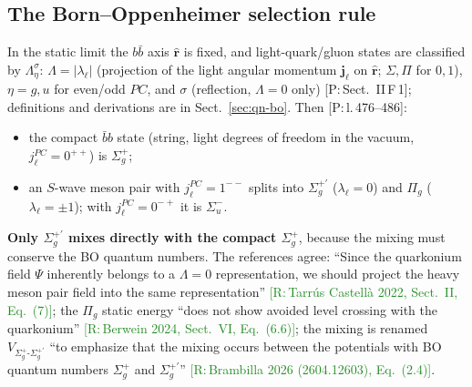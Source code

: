 \documentclass[11pt,a4paper]{article}
\newcommand{\tagP}[1]{\textcolor{blue!65!black}{\textsf{\small[P:\,#1]}}}
\newcommand{\tagR}[1]{\textcolor{ForestGreen}{\textsf{\small[R:\,#1]}}}
\begin{document}
\subsection{The Born--Oppenheimer selection rule}
\label{sec:BOrule}

In the static limit the $b\bar b$ axis $\hat{\bm r}$ is fixed, and light-quark/gluon states are classified by $\Lambda_\eta^\sigma$: $\Lambda=|\lambda_\ell|$ (projection of the light angular momentum $\bm j_\ell$ on $\hat{\bm r}$; $\Sigma,\Pi$ for $0,1$), $\eta=g,u$ for even/odd $PC$, and $\sigma$ (reflection, $\Lambda=0$ only) \tagP{Sect.~II\,F\,1}; definitions and derivations are in Sect.~\ref{sec:qn-bo}. Then \tagP{l.\,476--486}:
\begin{itemize}
\item the compact $\bar bb$ state (string, light degrees of freedom in the vacuum, $j_\ell^{PC}=0^{++}$) is $\Sigma_g^+$;
\item an $S$-wave meson pair with $j_\ell^{PC}=1^{--}$ splits into $\Sigma_g^{+\prime}$ ($\lambda_\ell=0$) and $\Pi_g$ ($\lambda_\ell=\pm1$); with $j_\ell^{PC}=0^{-+}$ it is $\Sigma_u^-$.
\end{itemize}
\textbf{Only $\Sigma_g^{+\prime}$ mixes directly with the compact $\Sigma_g^+$}, because the mixing must conserve the BO quantum numbers. The references agree: ``Since the quarkonium field $\Psi$ inherently belongs to a $\Lambda=0$ representation, we should project the heavy meson pair field into the same representation'' \tagR{Tarr\'us Castell\`a 2022, Sect.~II, Eq.~(7)}; the $\Pi_g$ static energy ``does not show avoided level crossing with the quarkonium'' \tagR{Berwein 2024, Sect.~VI, Eq.~(6.6)}; the mixing is renamed $V_{\Sigma_g^+\text{-}\Sigma_g^{+\prime}}$ ``to emphasize that the mixing occurs between the potentials with BO quantum numbers $\Sigma_g^+$ and $\Sigma_g^{+\prime}$'' \tagR{Brambilla 2026 (2604.12603), Eq.~(2.4)}.
\end{document}
